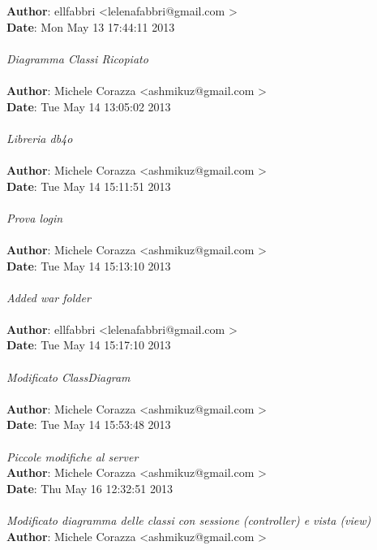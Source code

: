 \documentclass[a4paper,12pt]{article} %
\begin{document}
\textbf{Author}: ellfabbri \textless lelenafabbri@gmail.com \textgreater \\
\textbf{Date}:   Mon May 13 17:44:11 2013 \\
\\
    \emph{Diagramma Classi Ricopiato} \\
\\
\textbf{Author}: Michele Corazza \textless ashmikuz@gmail.com \textgreater \\
\textbf{Date}:   Tue May 14 13:05:02 2013 \\
\\
    \emph{Libreria db4o}\\
\\
\textbf{Author}: Michele Corazza \textless ashmikuz@gmail.com \textgreater \\
\textbf{Date}:   Tue May 14 15:11:51 2013\\
\\
    \emph{Prova login}\\
\\
\textbf{Author}: Michele Corazza \textless ashmikuz@gmail.com \textgreater \\
\textbf{Date}:   Tue May 14 15:13:10 2013 \\
\\
    \emph{Added war folder}\\
\\
\textbf{Author}: ellfabbri \textless lelenafabbri@gmail.com \textgreater \\
\textbf{Date}:   Tue May 14 15:17:10 2013 \\
\\
    \emph{Modificato ClassDiagram}\\
\\
\textbf{Author}: Michele Corazza \textless ashmikuz@gmail.com \textgreater \\
\textbf{Date}:   Tue May 14 15:53:48 2013 \\
\\
    \emph{Piccole modifiche al server}
\\
\textbf{Author}: Michele Corazza \textless ashmikuz@gmail.com \textgreater \\
\textbf{Date}:   Thu May 16 12:32:51 2013 \\
\\
    \emph{Modificato diagramma delle classi con sessione (controller) e vista (view)}
\\
\textbf{Author}: Michele Corazza \textless ashmikuz@gmail.com \textgreater \\
\end{document}
